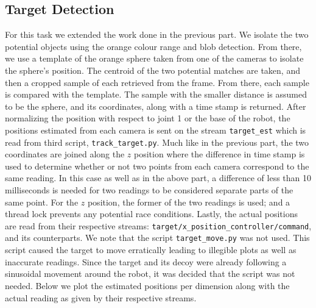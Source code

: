 \documentclass[11pt]{article}
\begin{document}
\subsection{Target Detection}
For this task we extended the work done in the previous part. 
We isolate the two potential objects using the orange colour range and blob detection. 
From there, we use a template of the orange sphere taken from one of the cameras to isolate the sphere's position. 
The centroid of the two potential matches are taken, and then a cropped sample of each retrieved from the frame. 
From there, each sample is compared with the template. 
The sample with the smaller distance is assumed to be the sphere, and its coordinates, along with a time stamp is returned.
After normalizing the position with respect to joint 1 or the base of the robot, the positions estimated from each camera is sent on the stream \texttt{target\_est} which is read from third script, \texttt{track\_target.py}. 
Much like in the previous part, the two coordinates are joined along the $z$ position where the difference in time stamp is used to determine whether or not two points from each camera correspond to the same reading. 
In this case as well as in the above part, a difference of less than 10 milliseconds is needed for two readings to be considered separate parts of the same point.  
For the $z$ position, the former of the two readings is used; and a thread lock prevents any potential race conditions. 
Lastly, the actual positions are read from their respective streams: \texttt{target/x\_position\_controller/command}, and its counterparts.
We note that the script \texttt{target\_move.py} was not used.
This script caused the target to move erratically leading to illegible plots as well as inaccurate readings.
Since the target and its decoy were already following a sinusoidal movement around the robot, it was decided that the script was not needed. 
Below we plot the estimated positions per dimension along with the actual reading as given by their respective streams.
\end{document}
